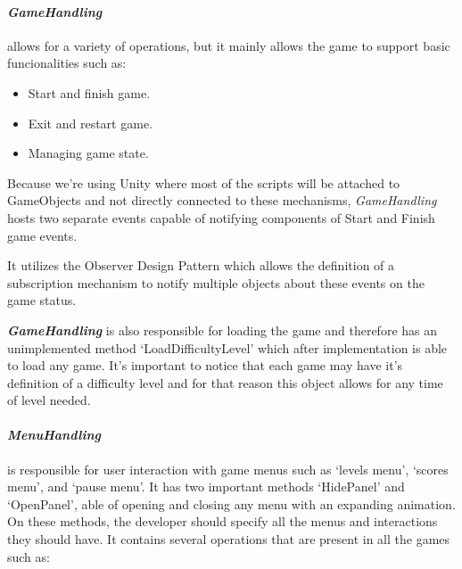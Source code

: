 

\newpage
\paragraph{\textit{GameHandling}} allows for a variety of operations, but it mainly allows the game to support basic funcionalities such as:

\vspace{-\topsep}  %
\begin{itemize}
    \setlength{\itemsep}{8pt}  %
    \setlength{\parskip}{0pt}  %
    \item Start and finish game.
    \item Exit and restart game.
    \item Managing game state.
\end{itemize}
\vspace{-\topsep}  %

Because we're using Unity where most of the scripts will be attached to GameObjects and not directly connected to these mechanisms, \textit{GameHandling} hosts two separate events capable of notifying components of Start and Finish game events.

It utilizes the Observer Design Pattern \cite{observer} which allows the definition of a subscription mechanism to notify multiple objects about these events on the game status.

\textbf{\textit{GameHandling}} is also responsible for loading the game and therefore has an unimplemented method `LoadDifficultyLevel' which after implementation is able to load any game. It's important to notice that each game may have it's definition of a difficulty level and for that reason this object allows for any time of level needed.\\

\paragraph{\textit{MenuHandling}} is responsible for user interaction with game menus such as `levels menu', `scores menu', and `pause menu'. It has two important methods `HidePanel' and `OpenPanel', able of opening and closing any menu with an expanding animation. On these methods, the developer should specify all the menus and interactions they should have. It contains several operations that are present in all the games such as:

